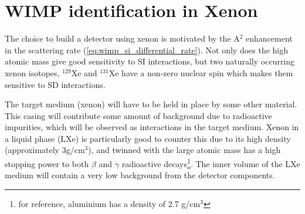 \section{WIMP identification in Xenon}
\label{sec:wimps_with_xenon}

\par
The choice to build a detector using xenon is motivated by the A$^2$ enhancement in the scattering rate (\autoref{eq:wimp_si_differential_rate}).
Not only does the high atomic mass give good sensitivity to SI interactions, but two naturally occurring xenon isotopes, ${}^{129}$Xe and ${}^{131}$Xe have a non-zero nuclear spin which makes them sensitive to SD interactions.
\par
The target medium (xenon) will have to be held in place by some other material.
This casing will contribute some amount of background due to radioactive impurities, which will be observed as interactions in the target medium.
Xenon in a liquid phase (LXe) is particularly good to counter this due to its high density (approximately 3g/cm${}^{3}$), and twinned with the large atomic mass has a high stopping power to both $\beta$ and $\gamma$ radioactive decays\footnote{for reference, aluminium has a density of 2.7 g/cm${}^{3}$}.
The inner volume of the LXe medium will contain a very low background from the detector components.



